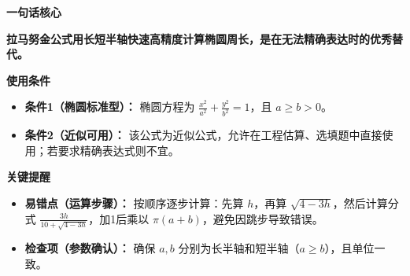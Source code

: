 \begin{summarybox}
	\textbf{\textcolor{CSummary}{一句话核心}}

	\textbf{拉马努金公式用长短半轴快速高精度计算椭圆周长，是在无法精确表达时的优秀替代。}

	\medskip

	\textbf{\textcolor{CSummary}{使用条件}}

	\begin{itemize}[leftmargin=*, itemsep=0.5em, topsep=0.4em]
		\item \textbf{条件1（椭圆标准型）：} 椭圆方程为 $\frac{x^2}{a^2}+\frac{y^2}{b^2}=1$，且 $a\ge b>0$。
		\item \textbf{条件2（近似可用）：} 该公式为近似公式，允许在工程估算、选填题中直接使用；若要求精确表达式则不宜。
	\end{itemize}

	\medskip

	\textbf{\textcolor{CSummary}{关键提醒}}

	\begin{itemize}[leftmargin=*, itemsep=0.5em, topsep=0.4em]
		\item \textbf{易错点（运算步骤）：} 按顺序逐步计算：先算 $h$，再算 $\sqrt{4-3h}$，然后计算分式 $\frac{3h}{10+\sqrt{4-3h}}$，加1后乘以 $\pi(a+b)$，避免因跳步导致错误。
		\item \textbf{检查项（参数确认）：} 确保 $a,b$ 分别为长半轴和短半轴（$a\ge b$），且单位一致。
	\end{itemize}
\end{summarybox}